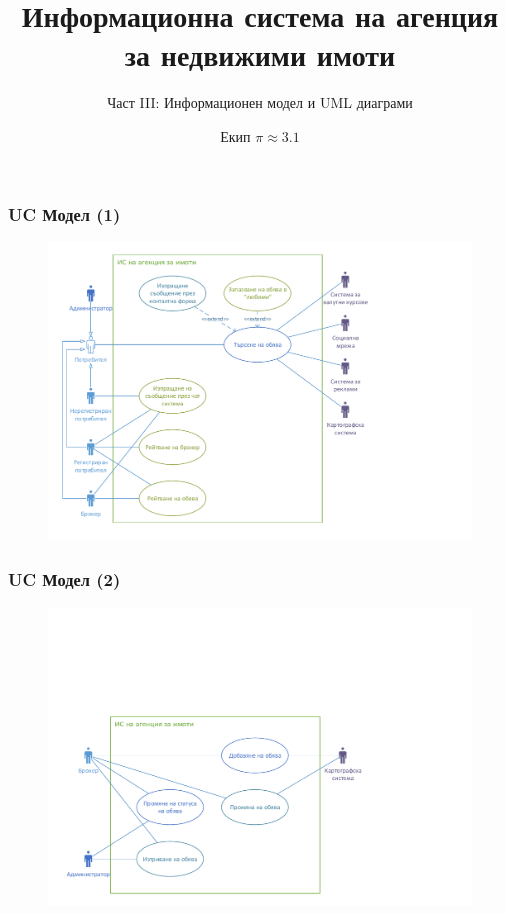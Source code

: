 \documentclass[12pt]{beamer}
\title{Информационна система на агенция за недвижими имоти}
\subtitle{Част III: Информационен модел и UML диаграми}
\author{Екип $\pi \approx 3.1$}
\date{}
\begin{document}
\begin{frame}
\titlepage
\end{frame}


\begin{frame}[fragile]
\frametitle{UC Модел (1)}
        \begin{figure}[h]
        \centering
        \includegraphics[scale=0.5]{uc2a}
        \end{figure}
\end{frame}

\begin{frame}[fragile]
\frametitle{UC Модел (2)}
        \begin{figure}[h]
        \centering
        \includegraphics[scale=0.5]{uc2b}
        \end{figure}
\end{frame}
\end{document}
